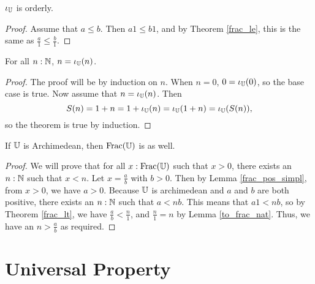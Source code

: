 \documentclass[../../math.tex]{subfiles}
\begin{document}
\begin{instance}
    $\iota_{\mathbb{U}}$ is orderly.
\end{instance}
\begin{proof}
    Assume that $a \leq b$.  Then $a1 \leq b1$, and by Theorem \ref{frac_le},
    this is the same as $\frac{a}{1} \leq \frac{b}{1}$.
\end{proof}

\begin{lemma} \label{to_frac_nat}
    For all $n : \mathbb{N}$, $n = \iota_{\mathbb{U}}(n)$.
\end{lemma}
\begin{proof}
    The proof will be by induction on $n$.  When $n = 0$, $0 = \iota_{\mathbb{U}}(0)$, so
    the base case is true.  Now assume that $n = \iota_{\mathbb{U}}(n)$.  Then
    \[
        S(n) = 1 + n = 1 + \iota_{\mathbb{U}}(n) = \iota_{\mathbb{U}}(1 + n) = \iota_{\mathbb{U}}(S(n)),
    \]
    so the theorem is true by induction.
\end{proof}

\begin{instance}
    If $\mathbb{U}$ is Archimedean, then $\operatorname{Frac}(\mathbb{U})$ is as well.
\end{instance}
\begin{proof}
    We will prove that for all $x : \operatorname{Frac}(\mathbb{U})$ such that $x > 0$, there exists
    an $n : \mathbb{N}$ such that $x < n$.  Let $x = \frac{a}{b}$ with $b > 0$.  Then by
    Lemma \ref{frac_pos_simpl}, from $x > 0$, we have $a > 0$.  Because $\mathbb{U}$ is
    archimedean and $a$ and $b$ are both positive, there exists an $n : \mathbb{N}$ such
    that $a < nb$.  This means that $a1 < nb$, so by Theorem \ref{frac_lt}, we
    have $\frac{a}{b} < \frac{n}{1}$, and $\frac{n}{1} = n$ by Lemma
    \ref{to_frac_nat}.  Thus, we have an $n > \frac{a}{b}$ as required.
\end{proof}

\section{Universal Property}
\end{document}
